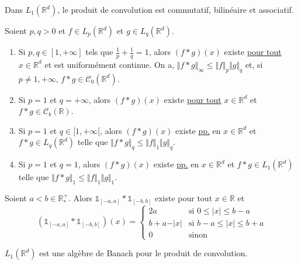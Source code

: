   \begin{proposition}
    Dans $L_1(\mathbb{R}^d)$, le produit de convolution est commutatif, bilinéaire et associatif.
  \end{proposition}

  \begin{theorem}
    Soient $p, q > 0$ et $f \in L_p(\mathbb{R}^d)$ et $g \in L_q(\mathbb{R}^d)$.
    \begin{enumerate}[label={\bfseries(\roman*)}]
      \item Si $p, q \in [1, +\infty]$ tels que $\frac{1}{p} + \frac{1}{q} = 1$, alors $(f * g)(x)$ existe \uline{pour tout} $x \in \mathbb{R}^d$ et est uniformément continue. On a, $\Vert f * g \Vert_\infty \leq \Vert f \Vert_p \Vert g \Vert_q$ et, si $p \neq 1, +\infty$, $f * g \in \mathcal{C}_0(\mathbb{R}^d)$.
      \item Si $p = 1$ et $q = +\infty$, alors $(f * g)(x)$ existe \uline{pour tout} $x \in \mathbb{R}^d$ et $f * g \in \mathcal{C}_b(\mathbb{R})$.
      \item Si $p = 1$ et $q \in [1, +\infty[$, alors $(f * g)(x)$ existe \uline{pp.} en $x \in \mathbb{R}^d$ et $f * g \in L_q(\mathbb{R}^d)$ telle que $\Vert f * g \Vert_q \leq \Vert f \Vert_1 \Vert g \Vert_q$.
      \item Si $p = 1$ et $q = 1$, alors $(f * g)(x)$ existe \uline{pp.} en $x \in \mathbb{R}^d$ et $f * g \in L_1(\mathbb{R}^d)$ telle que $\Vert f * g \Vert_1 \leq \Vert f \Vert_1 \Vert g \Vert_1$.
    \end{enumerate}
  \end{theorem}

  \begin{example}
    Soient $a < b \in \mathbb{R}^+_*$. Alors $\mathbb{1}_{[-a, a]} * \mathbb{1}_{[-b,b]}$ existe pour tout $x \in \mathbb{R}$ et
    \[ \left( \mathbb{1}_{[-a, a]} * \mathbb{1}_{[-b,b]} \right)(x) =
    \begin{cases}
      2a &\text{si } 0 \leq \vert x \vert \leq b-a \\
      b+a-\vert x \vert &\text{si } b-a \leq \vert x \vert \leq b+a \\
      0 &\text{sinon}
    \end{cases}
    \]
  \end{example}


  \begin{proposition}
    $L_1(\mathbb{R}^d)$ est une algèbre de Banach pour le produit de convolution.
  \end{proposition}

